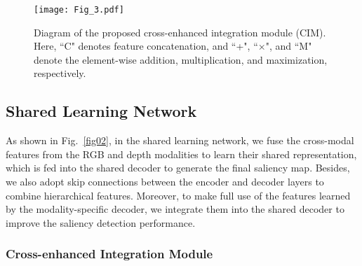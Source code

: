\documentclass[10pt,twocolumn,letterpaper]{article}
\begin{document}
\begin{figure}
	\begin{centering}
		\texttt{[image: Fig\_3.pdf]}
		\caption{Diagram of the proposed cross-enhanced integration module (CIM).
		Here, ``C" denotes feature concatenation, and ``+", ``$\times$", and ``M" denote the element-wise addition, multiplication, and maximization, respectively.
		}
		\label{fig03}
	\end{centering}
\end{figure}


\subsection{Shared Learning Network}
\label{sec3.3}

As shown in Fig.~\ref{fig02}, in the shared learning network, we fuse the cross-modal features from the RGB and depth modalities to learn their shared representation, which is fed into the shared decoder to generate the final saliency map. Besides, we also adopt skip connections between the encoder and decoder layers to combine hierarchical features. Moreover, to make full use of the features learned by the modality-specific decoder, we integrate them into the shared decoder to improve the saliency detection performance.


\subsubsection{Cross-enhanced Integration Module}
\label{CIM}
\end{document}
